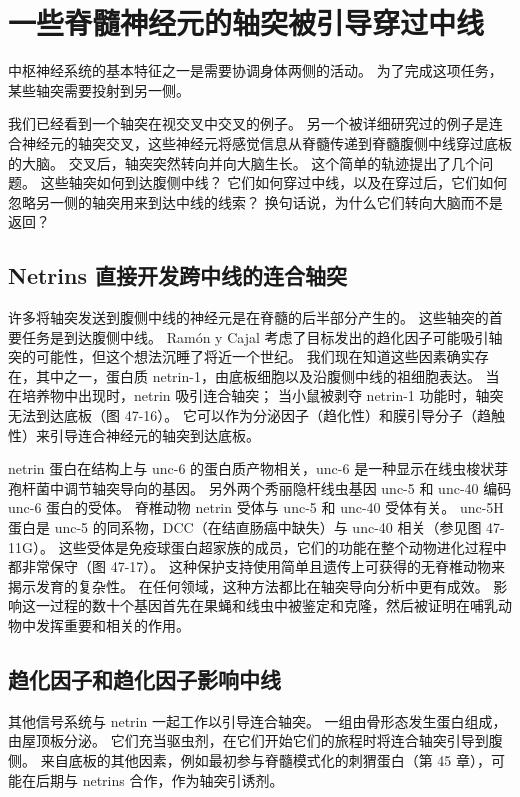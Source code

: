 \section{一些脊髓神经元的轴突被引导穿过中线}
中枢神经系统的基本特征之一是需要协调身体两侧的活动。 为了完成这项任务，某些轴突需要投射到另一侧。

我们已经看到一个轴突在视交叉中交叉的例子。 另一个被详细研究过的例子是连合神经元的轴突交叉，这些神经元将感觉信息从脊髓传递到脊髓腹侧中线穿过底板的大脑。 交叉后，轴突突然转向并向大脑生长。 这个简单的轨迹提出了几个问题。 这些轴突如何到达腹侧中线？ 它们如何穿过中线，以及在穿过后，它们如何忽略另一侧的轴突用来到达中线的线索？ 换句话说，为什么它们转向大脑而不是返回？

\subsection{Netrins 直接开发跨中线的连合轴突}
许多将轴突发送到腹侧中线的神经元是在脊髓的后半部分产生的。 这些轴突的首要任务是到达腹侧中线。 Ramón y Cajal 考虑了目标发出的趋化因子可能吸引轴突的可能性，但这个想法沉睡了将近一个世纪。 我们现在知道这些因素确实存在，其中之一，蛋白质 netrin-1，由底板细胞以及沿腹侧中线的祖细胞表达。 当在培养物中出现时，netrin 吸引连合轴突； 当小鼠被剥夺 netrin-1 功能时，轴突无法到达底板（图 47-16）。 它可以作为分泌因子（趋化性）和膜引导分子（趋触性）来引导连合神经元的轴突到达底板。

netrin 蛋白在结构上与 unc-6 的蛋白质产物相关，unc-6 是一种显示在线虫梭状芽孢杆菌中调节轴突导向的基因。 另外两个秀丽隐杆线虫基因 unc-5 和 unc-40 编码 unc-6 蛋白的受体。 脊椎动物 netrin 受体与 unc-5 和 unc-40 受体有关。 unc-5H 蛋白是 unc-5 的同系物，DCC（在结直肠癌中缺失）与 unc-40 相关（参见图 47-11G）。 这些受体是免疫球蛋白超家族的成员，它们的功能在整个动物进化过程中都非常保守（图 47-17）。 这种保护支持使用简单且遗传上可获得的无脊椎动物来揭示发育的复杂性。 在任何领域，这种方法都比在轴突导向分析中更有成效。 影响这一过程的数十个基因首先在果蝇和线虫中被鉴定和克隆，然后被证明在哺乳动物中发挥重要和相关的作用。

\subsection{趋化因子和趋化因子影响中线}
其他信号系统与 netrin 一起工作以引导连合轴突。 一组由骨形态发生蛋白组成，由屋顶板分泌。 它们充当驱虫剂，在它们开始它们的旅程时将连合轴突引导到腹侧。 来自底板的其他因素，例如最初参与脊髓模式化的刺猬蛋白（第 45 章），可能在后期与 netrins 合作，作为轴突引诱剂。

